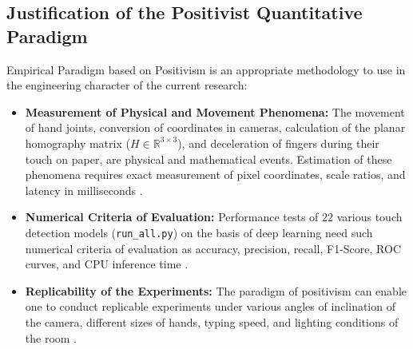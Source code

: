 \subsection{Justification of the Positivist Quantitative Paradigm}
\label{subsec:meth_paradigm_justification}
Empirical Paradigm based on Positivism is an appropriate methodology to use in the engineering character of the current research:
\begin{itemize}
    \item \textbf{Measurement of Physical and Movement Phenomena:} The movement of hand joints, conversion of coordinates in cameras, calculation of the planar homography matrix ($H \in \mathbb{R}^{3 \times 3}$), and deceleration of fingers during their touch on paper, are physical and mathematical events. Estimation of these phenomena requires exact measurement of pixel coordinates, scale ratios, and latency in milliseconds \cite{Zhang2020MediaPipe, Kallwies2020Determining}.
    \item \textbf{Numerical Criteria of Evaluation:} Performance tests of 22 various touch detection models (\texttt{run\_all.py}) on the basis of deep learning need such numerical criteria of evaluation as accuracy, precision, recall, F1-Score, ROC curves, and CPU inference time \cite{Hochreiter1997LSTM, Doan2022Efficient}.
    \item \textbf{Replicability of the Experiments:} The paradigm of positivism can enable one to conduct replicable experiments under various angles of inclination of the camera, different sizes of hands, typing speed, and lighting conditions of the room \cite{GilMartin2023Hand, Toshpulatov2024RealTime}.
\end{itemize}

